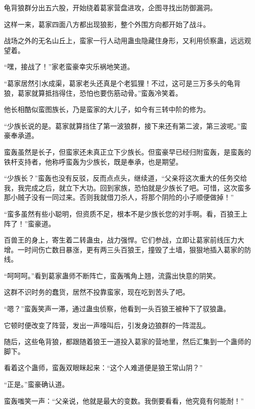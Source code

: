 \begin{this_body}
龟背狼群分出五六股，开始绕着葛家营盘进攻，企图寻找出防御漏洞。

这样一来，葛家四面八方都出现狼影，整个外围方向都开始了战斗。

战场之外的无名山丘上，蛮家一行人动用蛊虫隐藏住身形，又利用侦察蛊，远远观望着。

“嘿，接战了！”家老蛮豪幸灾乐祸地笑道。

“葛家居然引水成渠，葛家老头还真是个老狐狸！不过，这可是三万多头的龟背狼，葛家就算抵挡得住，恐怕也要伤筋动骨。”蛮轰冷笑着。

他长相酷似蛮图族长，乃是蛮家的大儿子，如今有三转中阶的修为。

“少族长说的是。葛家就算挡住了第一波狼群，接下来还有第二波，第三波呢。”蛮豪奉承道。

蛮轰虽然是长子，但蛮家还未真正立下少族长。但蛮豪早已经归附蛮轰，是蛮轰的铁杆支持者，他称呼蛮轰为少族长，既是奉承，也是期望。

“少族长？”蛮轰也没有反驳，反而点点头，继续道，“父亲将这次重大的任务交给我，我完成之后，就立下大功。回到家族，恐怕就是少族长了吧。可惜，这次蛮多那小贼子没有一同过来。否则我就借刀杀人，将那个阴险的小子顺便做掉！”

“蛮多虽然有些小聪明，但资质不足，根本不是少族长您的对手啊。看，百狼王上阵了！”蛮豪道。

百兽王的身上，寄生着二转蛊虫，战力强悍。它们参战，立即让葛家前线压力大增。一时间伤亡数目暴涨，更有两三头百狼王，撞毁了土墙，狠狠地插入葛家的防线。

“呵呵呵。”看到葛家蛊师不断阵亡，蛮轰嘴角上翘，流露出快意的阴笑。

这群不识时务的蠢货，居然不投靠蛮家，现在吃到苦头了吧。

“嗯？”蛮轰笑声一滞，通过蛊虫侦察，他看到一头百狼王被种下了驭狼蛊。

它顿时便改变了阵营，发出一声嚎叫后，引发身边狼群的一阵混乱。

随后，这些龟背狼，都跟随着狼王一道投入葛家的营地里，然后汇集到一个蛊师的脚下。

看着这个蛊师，蛮轰双眼眯起来：“这个人难道便是狼王常山阴？”

“正是。”蛮豪确认道。

蛮轰嗤笑一声：“父亲说，他就是最大的变数。我倒要看看，他究竟有何能耐！”

\end{this_body}

